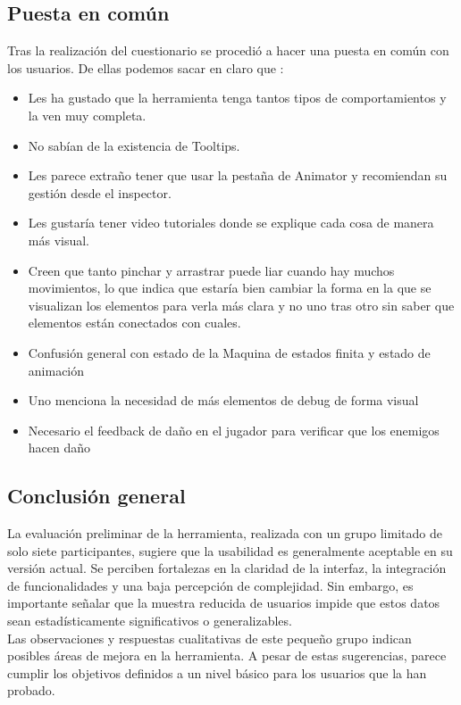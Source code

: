 \subsection{Puesta en común}
Tras la realización del cuestionario se procedió a hacer una puesta en común con los usuarios. De ellas podemos sacar en claro que :
\begin{itemize}
\item Les ha gustado que la herramienta tenga tantos tipos de comportamientos y la ven muy completa.
\item No sabían de la existencia de Tooltips.
\item Les parece extraño tener que usar la pestaña de Animator y recomiendan su gestión desde el inspector.
\item Les gustaría tener video tutoriales donde se explique cada cosa de manera más visual.
\item Creen que tanto pinchar y arrastrar puede liar cuando hay muchos movimientos, lo que indica que estaría bien cambiar la forma en la que se visualizan los elementos para verla más clara y no uno tras otro sin saber que elementos están conectados con cuales.
\item Confusión general con estado de la Maquina de estados finita y estado de animación
\item Uno menciona la necesidad de más elementos de debug de forma visual
\item Necesario el feedback de daño en el jugador para verificar que los enemigos hacen daño
\end{itemize}
\subsection{Conclusión general}

La evaluación preliminar de la herramienta, realizada con un grupo limitado de solo siete participantes, sugiere que la usabilidad es generalmente aceptable en su versión actual. Se perciben fortalezas en la claridad de la interfaz, la integración de funcionalidades y una baja percepción de complejidad. Sin embargo, es importante señalar que la muestra reducida de usuarios impide que estos datos sean estadísticamente significativos o generalizables.\\

Las observaciones y respuestas cualitativas de este pequeño grupo indican posibles áreas de mejora en la herramienta. A pesar de estas sugerencias, parece cumplir los objetivos definidos a un nivel básico para los usuarios que la han probado.

